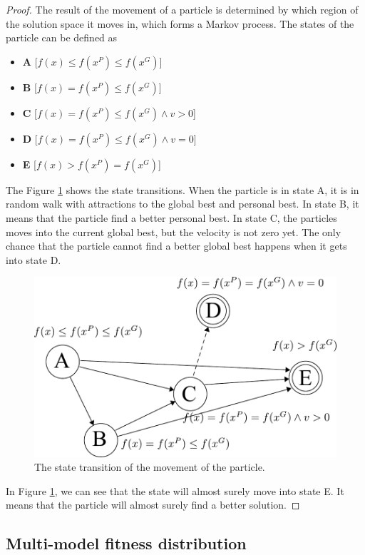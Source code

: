 \begin{mythm}
\begin{proof}
The result of the movement of a particle is determined by which region of the solution space it moves in, which forms a Markov process.
The states of the particle can be defined as
\begin{itemize}
\item \textbf{A} [$ f(x) \leq f(x^{P}) \leq f(x^{G}) $]
\item \textbf{B} [$ f(x) = f(x^{P}) \leq f(x^{G}) $] 
\item \textbf{C} [$ f(x) = f(x^{P}) \leq f(x^{G}) \land v > 0 $]
\item \textbf{D} [$ f(x) = f(x^{P}) \leq f(x^{G}) \land v = 0 $]
\item \textbf{E} [$ f(x) > f(x^{P}) = f(x^{G}) $]
\end{itemize}

The Figure \ref{fig:fsm} shows the state transitions.
When the particle is in state A, it is in random walk with attractions to the global best and personal best.
In state B, it means that the particle find a better personal best.
In state C, the particles moves into the current global best, but the velocity is not zero yet.
The only chance that the particle cannot find a better global best happens when it gets into state D.

\begin{figure}[tbph]
\centering
\includegraphics[width=0.7\linewidth]{./fig/fsm}
\caption{The state transition of the movement of the particle.}
\label{fig:fsm}
\end{figure}

In Figure \ref{fig:fsm}, we can see that the state will almost surely move into state E.
It means that the particle will almost surely find a better solution.
\end{proof}
\end{mythm}

\subsection{Multi-model fitness distribution}

